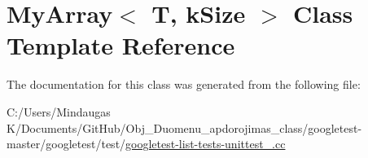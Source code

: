 \hypertarget{class_my_array}{}\section{My\+Array$<$ T, k\+Size $>$ Class Template Reference}
\label{class_my_array}


The documentation for this class was generated from the following file\+:\begin{DoxyCompactItemize}
\item 
C\+:/\+Users/\+Mindaugas K/\+Documents/\+Git\+Hub/\+Obj\+\_\+\+Duomenu\+\_\+apdorojimas\+\_\+class/googletest-\/master/googletest/test/\mbox{\hyperlink{googletest-master_2googletest_2test_2googletest-list-tests-unittest___8cc}{googletest-\/list-\/tests-\/unittest\+\_\+.\+cc}}\end{DoxyCompactItemize}
